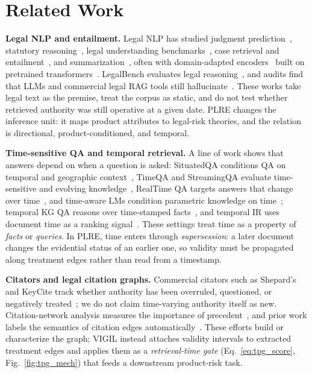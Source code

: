 \section{Related Work}
\label{sec:related_work}

\textbf{Legal NLP and entailment.} Legal NLP has studied judgment prediction~\citep{chalkidis2019neural}, statutory reasoning~\citep{holzenberger2020sara}, legal understanding benchmarks~\citep{chalkidis2022lexglue}, case retrieval and entailment~\citep{rabelo2022coliee}, and summarization~\citep{huang2021efficient,manor2019plain}, often with domain-adapted encoders~\citep{chalkidis2020legalbert,zheng2021legalbert,xiao2021lawformer} built on pretrained transformers~\citep{vaswani2017attention,devlin2019bert}. LegalBench evaluates legal reasoning~\citep{guha2023legalbench}, and audits find that LLMs and commercial legal RAG tools still hallucinate~\citep{dahl2024hallucinating,magesh2024hallucination}. These works take legal text as the premise, treat the corpus as static, and do not test whether retrieved authority was still operative at a given date. PLRE changes the inference unit: it maps product attributes to legal-risk theories, and the relation is directional, product-conditioned, and temporal.

\textbf{Time-sensitive QA and temporal retrieval.} A line of work shows that answers depend on when a question is asked: SituatedQA conditions QA on temporal and geographic context~\citep{zhang2021situatedqa}, TimeQA and StreamingQA evaluate time-sensitive and evolving knowledge~\citep{chen2021timeqa,liska2022streamingqa}, RealTime QA targets answers that change over time~\citep{kasai2023realtimeqa}, and time-aware LMs condition parametric knowledge on time~\citep{dhingra2022timeaware}; temporal KG QA reasons over time-stamped facts~\citep{saxena2021cronkgqa}, and temporal IR uses document time as a ranking signal~\citep{campos2014temporal}. These settings treat time as a property of \emph{facts} or \emph{queries}. In PLRE, time enters through \emph{supersession}: a later document changes the evidential status of an earlier one, so validity must be propagated along treatment edges rather than read from a timestamp.

\textbf{Citators and legal citation graphs.} Commercial citators such as Shepard's and KeyCite track whether authority has been overruled, questioned, or negatively treated~\citep{shepards2024,keycite2024}; we do not claim time-varying authority itself as new. Citation-network analysis measures the importance of precedent~\citep{fowler2007network}, and prior work labels the semantics of citation edges automatically~\citep{sadeghian2018semantic}. These efforts build or characterize the graph; VIGIL instead attaches validity intervals to extracted treatment edges and applies them as a \emph{retrieval-time gate} (Eq.~\eqref{eq:tpg_score}, Fig.~\ref{fig:tpg_mech}) that feeds a downstream product-risk task.

